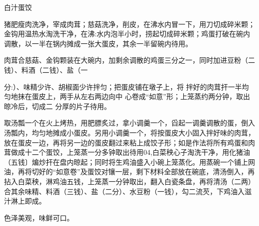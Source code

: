 \begin{recipe}[如意蛋饺]{白汁蛋饺}

\ingredients



\cooking

\step 猪肥瘦肉洗净，宰成肉茸；慈菇洗净，削皮，在沸水内冒一下，用刀切成碎米颗；金钩用温热水淘洗干净，在沸:水内泡半小时，捞起切成碎米颗；鸡蛋打破在碗内调散，以一半在锅内摊成一张大蛋皮，其余一半留碗内待用。

\step 肉茸合慈菇、金钩颗装在大碗内，加剩余调散的鸡蛋三分之一，同时加进豆粉（二钱）、料酒（二钱）、盐（一

分:）、味精少许、胡椒面少许拌匀；把蛋皮铺在墩子上，将 拌好的肉茸扞一半均匀地抹在蛋皮上，两手从左右两边向中 心卷成“如意”形；上笼蒸约两分钟，取出晾冷后，切成二 分厚的片子待用。

\step 取汤瓢一个在火上烤热，用肥膘炙过，拿小调羹一个，舀起一调羹调散的蛋，倒入汤瓢内，均匀地摊成小蛋皮。另用小调羹一个，将按蛋皮大小固入拌好味的肉茸，放在蛋皮一边，再将另一边的蛋皮翻过来粘上成饺子形；如是作法将所有鸡蛋和肉茸做成十二个蛋饺，上笼蒸一分多钟取出待用04,白菜秧心子淘洗干净，用化猪油（五钱〕煸炒扞在盘内晾起；同时将生鸡油盛入小碗上笼蒸化。用蒸碗一个铺上网油，再将切好的“如意卷”及蛋饺对镶一层，剩下材料全部放在碗底，清汤倒入，再拈入白菜秧，淋鸡油五钱，上笼蒸一分钟取出，翻入白瓷条盘，再将清汤（二两）合其余味精、料酒（三钱）、盐（二分）、水豆粉（一钱），勾二流芡，下鸡油入滋汁淋上即成。

\notes

色泽美观，味鲜可口。

\end{recipe}

